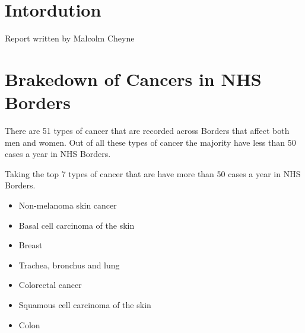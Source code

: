 \documentclass[
]{article}
\providecommand{\tightlist}{%
  \setlength{\itemsep}{0pt}\setlength{\parskip}{0pt}}
\begin{document}
\hypertarget{intordution}{%
\section{Intordution}\label{intordution}}

Report written \n by \n Malcolm Cheyne

\hypertarget{brakedown-of-cancers-in-nhs-borders}{%
\section{Brakedown of Cancers in NHS
Borders}\label{brakedown-of-cancers-in-nhs-borders}}

There are 51 types of cancer that are recorded across Borders that
affect both men and women. Out of all these types of cancer the majority
have less than 50 cases a year in NHS Borders.

Taking the top 7 types of cancer that are have more than 50 cases a year
in NHS Borders.

\begin{itemize}
\tightlist
\item
  Non-melanoma skin cancer\\
\item
  Basal cell carcinoma of the skin\\
\item
  Breast\\
\item
  Trachea, bronchus and lung\\
\item
  Colorectal cancer\\
\item
  Squamous cell carcinoma of the skin\\
\item
  Colon
\end{itemize}
\end{document}
